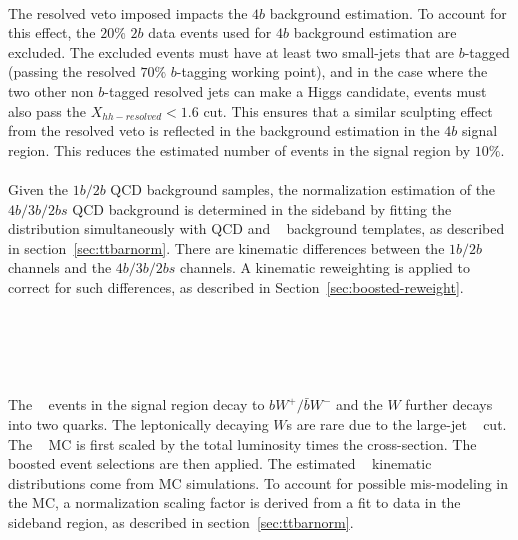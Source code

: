 \paragraph{} 
The resolved veto imposed impacts the $4b$ background estimation. 
To account for this effect, the $20\%$ $2b$ data events used for $4b$ background estimation are excluded.
The excluded events must have at least two small-\R jets that are $b$-tagged (passing the resolved $70\%$ $b$-tagging working point), and in the case where the two other non $b$-tagged resolved jets can make a Higgs candidate, events must also pass the $X_{hh-resolved} < 1.6$ cut.
This ensures that a similar sculpting effect from the resolved veto is reflected in the background estimation in the $4b$ signal region.
This reduces the estimated number of events in the signal region by $10\%$.

\paragraph{}
Given the $1b/2b$ QCD background samples, the normalization estimation of the $4b/3b/2bs$ QCD background is determined in the sideband by fitting the \mleadJ~ distribution simultaneously with QCD and \ttbar~ background templates, as described in section~\ref{sec:ttbarnorm}.
There are kinematic differences between the $1b/2b$ channels and the $4b/3b/2bs$ channels.  
A kinematic reweighting is applied to correct for such differences, as described in Section~\ref{sec:boosted-reweight}.


\section{\ttbar~}
\label{sec:boosted-ttbar}

\paragraph{}
The \ttbar~ events in the signal region decay to $bW^{+}/\bar{b}W^{-}$ and the $W$ further decays into two quarks.
The leptonically decaying $W$s are rare due to the large-\R jet \pt~ cut.
The \ttbar~ MC is first scaled by the total luminosity times the cross-section.
The boosted event selections are then applied.
The estimated \ttbar~ kinematic distributions come from MC simulations.
To account for possible mis-modeling in the MC, a normalization scaling factor is derived from a fit to data in the sideband region, as described in section~\ref{sec:ttbarnorm}.

